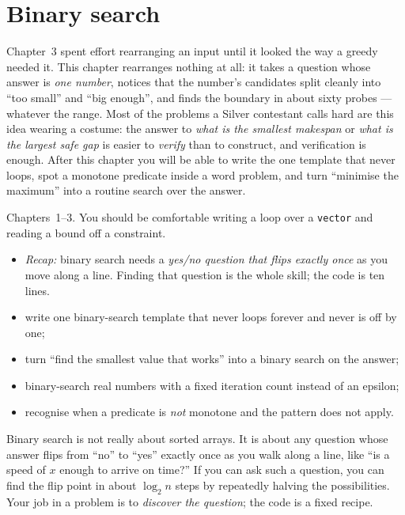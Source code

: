 \chapter{Binary search}\label{ch:bsearch}

Chapter~3 spent effort rearranging an input until it looked the way a
greedy needed it. This chapter rearranges nothing at all: it takes a
question whose answer is \emph{one number}, notices that the number's
candidates split cleanly into ``too small'' and ``big enough'', and finds
the boundary in about sixty probes --- whatever the range. Most of the
problems a Silver contestant calls hard are this idea wearing a costume:
the answer to \emph{what is the smallest makespan} or \emph{what is the
largest safe gap} is easier to \emph{verify} than to construct, and
verification is enough. After this chapter you will be able to write the
one template that never loops, spot a monotone predicate inside a word
problem, and turn ``minimise the maximum'' into a routine search over the
answer.

\begin{rulebox}
Chapters~1--3. You should be comfortable writing a loop over a \texttt{vector} and reading a bound off a constraint.
\begin{itemize}
\item \emph{Recap:} binary search needs a \emph{yes/no question that flips exactly once} as you move along a line. Finding that question is the whole skill; the code is ten lines.
\end{itemize}
\end{rulebox}
\begin{wins}
\begin{itemize}
\item write one binary-search template that never loops forever and never is off by one;
\item turn ``find the smallest value that works'' into a binary search on the answer;
\item binary-search real numbers with a fixed iteration count instead of an epsilon;
\item recognise when a predicate is \emph{not} monotone and the pattern does not apply.
\end{itemize}
\end{wins}
\begin{principle}
Binary search is not really about sorted arrays. It is about any question whose answer flips from ``no'' to ``yes'' exactly once as you walk along a line, like ``is a speed of $x$ enough to arrive on time?'' If you can ask such a question, you can find the flip point in about $\log_2 n$ steps by repeatedly halving the possibilities. Your job in a problem is to \emph{discover the question}; the code is a fixed recipe.
\end{principle}

